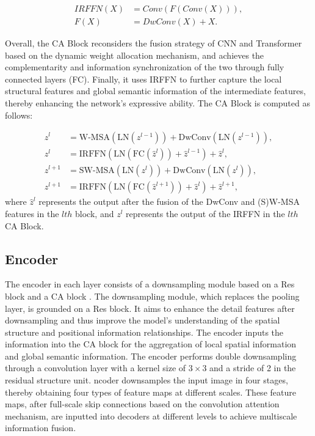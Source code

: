 \begin{equation}
	\begin{aligned}
		\label{eq:irffn}
		IRFFN\left( X \right) &= Conv\left( F \left( Conv \left(  X \right)  \right) \right), \\
		F\left( X \right) &= DwConv\left( X \right) + X.
	\end{aligned}
\end{equation}

Overall, the CA Block reconsiders the fusion strategy of CNN and Transformer based on the dynamic weight allocation mechanism, and achieves the complementarity and information synchronization of the two through fully connected layers (FC). Finally, it uses IRFFN to further capture the local structural features and global semantic information of the intermediate features, thereby enhancing the network's expressive ability. The CA Block is computed as follows:


\begin{equation}
	\begin{aligned}
		\label{eq:error-mae}
		\hat{z}^{l} &= \mathrm{W \text{-} M S A}\left(\mathrm{L N}\left(z^{l-1}\right)\right) + \mathrm{DwConv} \left(  \mathrm{LN} \left(  z^{l-1} \right) \right), \\
		z^{l} &= \mathrm{I R F F N}\left(\mathrm{L N}\left( \mathrm{FC} \left( \hat{z}^{l}  \right) \right) +  \hat{z}^{l-1}  \right)+\hat{z}^{l}, \\
		\hat{z}^{l+1} &= \mathrm{S W \text{-} M S A}\left(\mathrm{L N}\left(z^{l}\right)\right) + \mathrm{DwConv} \left(  \mathrm{LN} \left(  z^{l} \right) \right), \\
		z^{l+1} &= \mathrm{I R F F N}\left(\mathrm{L N}\left( \mathrm{FC} \left( \hat{z}^{l+1}  \right) \right) +  \hat{z}^{l}  \right)+\hat{z}^{l+1},
	\end{aligned}
\end{equation}where $\hat{z}^{l}$ represents the output after the fusion of the DwConv and (S)W-MSA features in the $lth$ block, and $z^{l}$ represents the output of the IRFFN in the $lth$ CA Block.

\subsection{Encoder}
The encoder in each layer consists of a downsampling module based on a Res block and a CA block . The downsampling module, which replaces the pooling layer, is grounded on a Res block. It aims to enhance the detail features after downsampling and thus improve the model's understanding of the spatial structure and positional information relationships. The encoder inputs the information into the CA block for the aggregation of local spatial information and global semantic information. The encoder performs double downsampling through a convolution layer with a kernel size of $3 \times 3$ and a stride of 2 in the residual structure unit. ncoder downsamples the input image in four stages, thereby obtaining four types of feature maps at different scales. These feature maps, after full-scale skip connections based on the convolution attention mechanism, are inputted into decoders at different levels to achieve multiscale information fusion.

